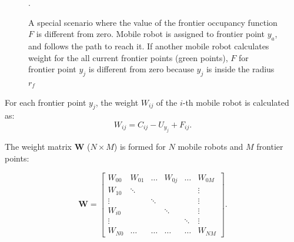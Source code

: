 \begin{figure}[t!]
	\centering
	\caption{A special scenario where the value of the frontier occupancy function $F$ is different from zero. Mobile robot is assigned to frontier point $y_a$, and follows the path to reach it. If another mobile robot calculates weight for the all current frontier points (green points), $F$ for frontier point $y_j$ is different from zero because $y_j$ is inside the radius $r_f$}.
	\label{fig:gauss}
\end{figure}

For each frontier point $y_{j}$, the weight $W_{ij}$ of the $i$-th mobile robot is calculated as: 
\begin{equation}
   {W}_{ij}= {C_{ij}} - {U_{y_{j}}} + {F_{ij}}.
   \label{weight}
\end{equation}

The weight matrix $\boldsymbol{W}$ ($N\times M$) is formed for $N$ mobile robots and $M$ frontier points: 

\begin{equation}
    \boldsymbol{W} = \begin{bmatrix}
    W_{00} & W_{01} & \hdots & W_{0j} & \hdots & W_{0M}\\
    W_{10} & \ddots & & & & \vdots\\
    \vdots & & \ddots & & &  \vdots \\
    W_{i0} & & & \ddots & & \vdots \\
    \vdots & & & & \ddots & \vdots\\
    W_{N0} & \hdots  & \hdots  & \hdots  & \hdots &    W_{NM}
    \end{bmatrix}.
\end{equation}

